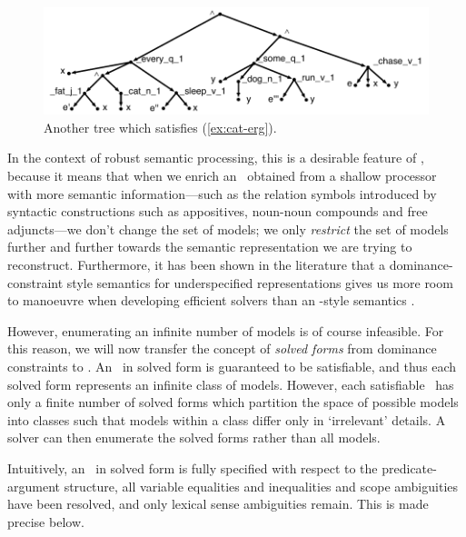 \begin{figure}
  \centering
  \includegraphics[width=\columnwidth]{pic-more-stuff}
  \caption{Another tree which satisfies (\ref{ex:cat-erg}).}
  \label{fig:fat-black-cat}
\end{figure}

In the context of robust semantic processing, this is a desirable
feature of \rmrs, because it means that when we enrich an \rmrs\
obtained from a shallow processor with more semantic
information---such as the relation symbols introduced by
syntactic 
constructions such as appositives, noun-noun compounds and free
adjuncts---we don't change the set of models;
we only \emph{restrict} the set of models further and further towards
the semantic representation we are trying to reconstruct.
Furthermore, it has been shown in the literature that a
dominance-constraint style semantics for underspecified
representations gives us more room to manoeuvre when developing
efficient solvers than an \mrs-style semantics
\cite{Althaus_etal:JoA}.

However, enumerating an infinite number of models is of course
infeasible.  For this reason, we will now transfer the concept of
\emph{solved forms} from dominance constraints to \rmrs.  An \rmrs\ in
solved form is guaranteed to be satisfiable, and thus each solved form
represents an infinite class of models.  However, each satisfiable
\rmrs\ has only a finite number of solved forms which partition the
space of possible models into classes such that models within a class
differ only in `irrelevant' details.  A solver can then enumerate the
solved forms 
rather than all models.

Intuitively, an \rmrs\ in solved form is fully
specified with respect to the predicate-argument structure, all
variable equalities and inequalities and scope ambiguities have been
resolved, and only lexical sense ambiguities remain.  This is made
precise below.

